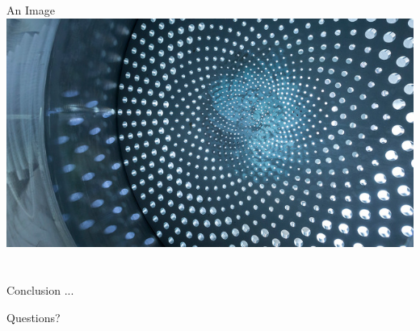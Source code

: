 \documentclass[aspectratio=169]{beamer}
\begin{document}
\begin{frame}{An Image}
  \centering
  \includegraphics[height=0.6\textheight]{figures/photoexample-169}
\end{frame}


\section*{}

\begin{frame}{Conclusion}
  ...
\end{frame}

\begin{frame}[c]
  \centering
  \Large Questions?
\end{frame}
\end{document}
